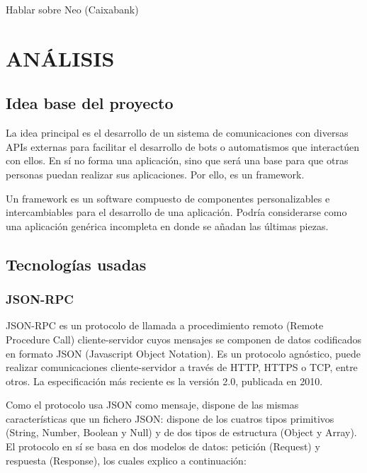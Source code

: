 \documentclass[spanish,12pt, a4paper, twoside]{paper}
\let\oldsection\section
\def\section{\cleardoublepage\oldsection}
\begin{document}
Hablar sobre Neo (Caixabank)

\section{ANÁLISIS}

\subsection{Idea base del proyecto}

La idea principal es el desarrollo de un sistema de comunicaciones con diversas APIs externas para facilitar el desarrollo de bots o automatismos que interactúen con ellos. En sí no forma una aplicación, sino que será una base para que otras personas puedan realizar sus aplicaciones. Por ello, es un framework.
\newline

Un framework es un software compuesto de componentes personalizables e intercambiables para el desarrollo de una aplicación. Podría considerarse como una aplicación genérica incompleta en donde se añadan las últimas piezas. \cite[pág. 1]{FrameworkJJG}

\subsection{Tecnologías usadas}

\subsubsection{JSON-RPC}

JSON-RPC es un protocolo de llamada a procedimiento remoto (Remote Procedure Call) cliente-servidor cuyos mensajes se componen de datos codificados en formato JSON (Javascript Object Notation). Es un protocolo agnóstico, puede realizar comunicaciones cliente-servidor a través de HTTP, HTTPS o TCP, entre otros. La especificación más reciente es la versión 2.0, publicada en 2010.

Como el protocolo usa JSON como mensaje, dispone de las mismas características que un fichero JSON: dispone de los cuatros tipos primitivos (String, Number, Boolean y Null) y de dos tipos de estructura (Object y Array).
El protocolo en sí se basa en dos modelos de datos: petición (Request) y respuesta (Response), los cuales explico a continuación:
\end{document}
